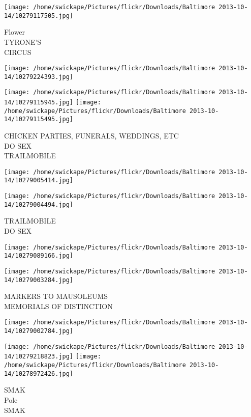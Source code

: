 \documentclass[10pt,letterpaper]{article}
\begin{document}
\texttt{[image: /home/swickape/Pictures/flickr/Downloads/Baltimore 2013-10-14/10279117505.jpg]}

Flower\\
TYRONE'S\\
CIRCUS
\pagebreak

\texttt{[image: /home/swickape/Pictures/flickr/Downloads/Baltimore 2013-10-14/10279224393.jpg]}

\vspace{0.25in}
\texttt{[image: /home/swickape/Pictures/flickr/Downloads/Baltimore 2013-10-14/10279115945.jpg]}
\texttt{[image: /home/swickape/Pictures/flickr/Downloads/Baltimore 2013-10-14/10279115495.jpg]}

CHICKEN PARTIES, FUNERALS, WEDDINGS, ETC\\
DO SEX\\
TRAILMOBILE
\pagebreak

\texttt{[image: /home/swickape/Pictures/flickr/Downloads/Baltimore 2013-10-14/10279005414.jpg]}

\vspace{0.25in}
\texttt{[image: /home/swickape/Pictures/flickr/Downloads/Baltimore 2013-10-14/10279004494.jpg]}

TRAILMOBILE\\
DO SEX
\pagebreak

\texttt{[image: /home/swickape/Pictures/flickr/Downloads/Baltimore 2013-10-14/10279089166.jpg]}

\vspace{0.25in}
\texttt{[image: /home/swickape/Pictures/flickr/Downloads/Baltimore 2013-10-14/10279003284.jpg]}

MARKERS TO MAUSOLEUMS\\
MEMORIALS OF DISTINCTION
\pagebreak

\texttt{[image: /home/swickape/Pictures/flickr/Downloads/Baltimore 2013-10-14/10279002784.jpg]}

\vspace{0.25in}
\texttt{[image: /home/swickape/Pictures/flickr/Downloads/Baltimore 2013-10-14/10279218823.jpg]}
\texttt{[image: /home/swickape/Pictures/flickr/Downloads/Baltimore 2013-10-14/10278972426.jpg]}

SMAK\\
Pole\\
SMAK
\pagebreak
\end{document}
